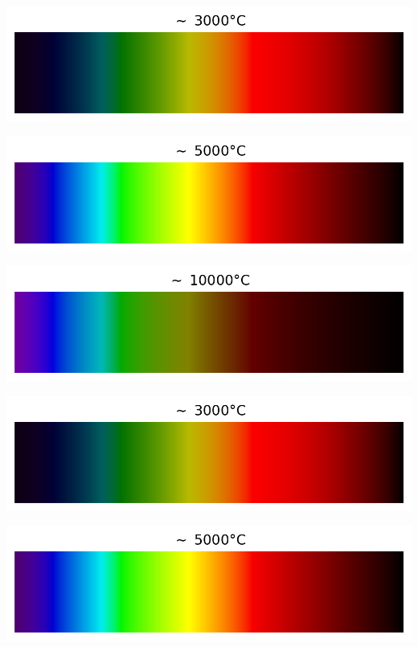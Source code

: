 \documentclass[12pt,a4paper,fleqn]{article}
\begin{document}
\begin{landscape}
\begin{center}
\begin{multicols}{3}
\includegraphics[width=\linewidth]{images/spectrum_black_body_temp3000K.png}

\includegraphics[width=\linewidth]{images/spectrum_black_body_temp5000K.png}

\includegraphics[width=\linewidth]{images/spectrum_black_body_temp10000K.png}
\end{multicols}
\end{center}

\begin{center}
\begin{multicols}{3}
\includegraphics[width=\linewidth]{images/spectrum_black_body_temp3000K.png}

\includegraphics[width=\linewidth]{images/spectrum_black_body_temp5000K.png}


\end{multicols}
\end{center}
\end{landscape}
\end{document}
